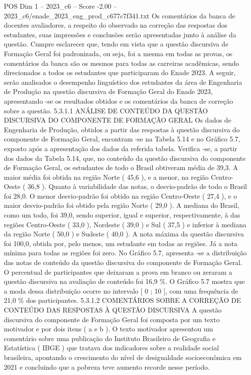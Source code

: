 \begin{textsample}{POS Dim 1 – 2023\_c6 – Score -2.00 – 2023\_c6/enade\_2023\_eng\_prod\_c677c7f341.txt}
Os comentários da banca de docentes avaliadores, a respeito do observado na correção das respostas dos estudantes, suas impressões e conclusões serão apresentadas junto à análise da questão.
Cumpre esclarecer que, tendo em vista que a questão discursiva de Formação Geral foi padronizada, ou seja, foi a mesma em todas as provas, os comentários da banca são os mesmos para todas as carreiras acadêmicas, sendo direcionados a todos os estudantes que participaram do Enade 2023.
A seguir, serão analisados o desempenho linguístico dos estudantes da área de Engenharia de Produção na questão discursiva de Formação Geral do Enade 2023, apresentando -se os resultados obtidos e os comentários da banca de correção sobre a questão. 5.3.1.1 ANÁLISE DE CONTEÚDO DA QUESTÃO DISCURSIVA DO COMPONENTE DE FORMAÇÃO GERAL Os dados de Engenharia de Produção, obtidos a partir das respostas à questão discursiva do componente de Formação Geral, encontram -se na Tabela 5.14 e no Gráfico 5.7, exposto após a apresentação dos dados da referida tabela.
Verifica -se, a partir dos dados da Tabela 5.14, que, no conteúdo da questão discursiva do componente de Formação Geral, os estudantes de todo o Brasil obtiveram média de 39,3.
A maior média foi obtida na região Norte ( 45,6 ), e a menor, na região Centro-Oeste ( 36,8 ).
Quanto à variabilidade das notas, o desvio-padrão de todo o Brasil foi 28,0.
O menor desvio-padrão foi obtido na região Centro-Oeste ( 27,4 ), e o maior desvio-padrão foi obtido pela região Norte ( 29,0 ).
A mediana do Brasil, como um todo, foi 39,0, sendo superior, igual e superior, respectivamente, à das regiões Centro-Oeste ( 33,0 ), Nordeste ( 39,0 ) e Sul ( 37,5 ) e inferior à mediana da região Norte ( 50,0 ) e Sudeste ( 40,0 ).
A nota máxima da questão discursiva foi 100,0, obtida por, pelo menos, um estudante em todas as regiões.
Já a nota mínima para todas as regiões foi zero.
No Gráfico 5.7, apresenta -se a distribuição das notas de conteúdo da questão discursiva do componente de Formação Geral.
O percentual de participantes que deixaram a prova em branco ou zeraram a questão discursiva na avaliação de conteúdo foi 16,9 \%.
O Gráfico 5.7 mostra que a moda dessa distribuição ocorre no intervalo [ 0 ; 10 ], com uma frequência de 21,0 \% dos participantes. 5.3.1.2 COMENTÁRIOS SOBRE A CORREÇÃO DE CONTEÚDO DAS RESPOSTAS À QUESTÃO DISCURSIVA A questão discursiva do componente de Formação Geral foi composta por um texto motivador e por dois itens ( a e b ).
O texto motivador apresentou um comentário sobre uma publicação do Instituto Brasileiro de Geografia e Estatística ( IBGE ) que tratava dos indicadores sobre a realidade social brasileira, apontando o crescimento do nível de desigualdade socioeconômica em 2021 e concluindo que a pobreza teve aumento recorde nesse período.

\end{textsample}
